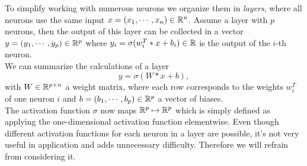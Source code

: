 To simplify working with numerous neurons we organize them in \textit{layers}, where all neurons use the same input $x=(x_1,\cdots,x_n)\in\mathbb{R}^n$. 
Assume a layer with $p$ neurons, then the output of this layer can be collected in a vector $y= (y_1,\cdots,y_p)\in\mathbb{R}^p$ where $y_i=\sigma( w_i^T*x+b_i) \in \mathbb{R}$ is the output of the $i$-th neuron.\\
We can summarize the calculations of a layer 
$$y=\sigma(W*x+b),$$
with $W\in\mathbb{R}^{p\times n}$ a weight matrix, where each row corresponds to the weights $w_i^T$ of one neuron $i$ and $b=(b_1,\cdots,b_p)\in\mathbb{R}^p$ a vector of biases. \\
The activation function $\sigma$ now maps $\mathbb{R}^p \mapsto \mathbb{R}^p$ which is simply defined as applying the one-dimensional activation function elementwise. Even though different activation functions for each neuron in a layer are possible, it's not very useful in application and adds unnecessary difficulty. Therefore we will refrain from considering it.\\

